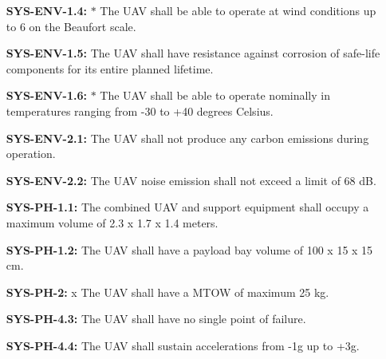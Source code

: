 \begin{enumerate}[leftmargin =4.5cm, align=parleft, labelwidth=10em]
    \item[\textbf{SYS-ENV-1.4:} $\ast$ ] The UAV shall be able to operate at wind conditions up to 6 on the Beaufort scale.
    \item[\textbf{SYS-ENV-1.5:}] The UAV shall have resistance against corrosion of safe-life components for its entire planned lifetime.
    \item[\textbf{SYS-ENV-1.6:} $\ast$ ] The UAV shall be able to operate nominally in temperatures ranging from -30 to +40 degrees Celsius.
    \item[\textbf{SYS-ENV-2.1:} \dag] The UAV shall not produce any carbon emissions during operation. 
    \item[\textbf{SYS-ENV-2.2:}] The UAV noise emission shall not exceed a limit of 68 dB.
    \item[\textbf{SYS-PH-1.1:} \ddag] The combined UAV and support equipment shall occupy a maximum volume of 2.3 x 1.7 x 1.4 meters. 
    \item[\textbf{SYS-PH-1.2:} \dag] The UAV shall have a payload bay volume of 100 x 15 x 15 cm.    
    \item[\textbf{SYS-PH-2:} x ] The UAV shall have a MTOW of maximum 25 kg.
    \item[\textbf{SYS-PH-4.3:}] The UAV shall have no single point of failure.
    \item[\textbf{SYS-PH-4.4:}] The UAV shall sustain accelerations from -1g up to +3g.


\end{enumerate}
